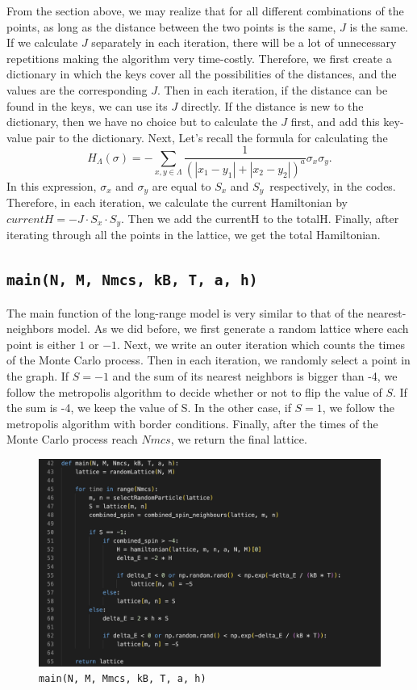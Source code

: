 \documentclass[11pt]{book}
\begin{document}
From the section above, we may realize that for all different combinations of the points, as long as the distance between the two points is the same, $J$ is the same. If we calculate $J$ separately in each iteration, there will be a lot of unnecessary repetitions making the algorithm very time-costly. Therefore, we first create a dictionary in which the keys cover all the possibilities of the distances, and the values are the corresponding $J$. Then in each iteration, if the distance can be found in the keys, we can use its $J$ directly. If the distance is new to the dictionary, then we have no choice but to calculate the $J$ first, and add this key-value pair to the dictionary. Next, Let's recall the formula for calculating the 
\[
H_{\Lambda}(\sigma) = -  \sum_{x,y\in \Lambda}\frac{1}{(\left| x_1 - y_1 \right| + \left| x_2 - y_2 \right|)^a}\sigma_x \sigma_y.
\]
In this expression, $\sigma_x$ and $\sigma_y$ are equal to $S_x$ and $S_y$\, respectively, in the codes. Therefore, in each iteration, we calculate the current Hamiltonian by $currentH = -J \cdot S_x \cdot S_y$. Then we add the currentH to the totalH. Finally, after iterating through all the points in the lattice, we get the total Hamiltonian. 

\subsection{\texttt{main(N, M, Nmcs, kB, T, a, h)}}

The main function of the long-range model is very similar to that of the nearest-neighbors model. As we did before, we first generate a random lattice where each point is either $1$ or $-1$. Next, we write an outer iteration which counts the times of the Monte Carlo process. Then in each iteration, we randomly select a point in the graph. If $S = -1$ and the sum of its nearest neighbors is bigger than -4, we follow the metropolis algorithm to decide whether or not to flip the value of $S$. If the sum is -4, we keep the value of S. In the other case, if $S = 1$, we follow the metropolis algorithm with border conditions. Finally, after the times of the Monte Carlo process reach $Nmcs$, we return the final lattice.

\begin{figure}
    \centering
    \includegraphics[width=1\linewidth]{lr_main.png}
    \caption{\texttt{main(N, M, Mmcs, kB, T, a, h)}}
    \label{fig47}
\end{figure}
\end{document}
